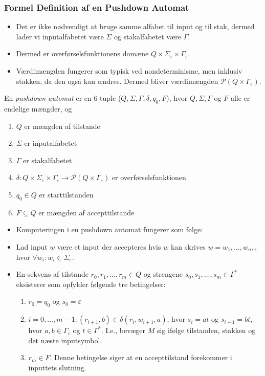\begin{frame}[allowframebreaks]
	\frametitle{Formel Definition af en Pushdown Automat}
	\begin{itemize}
		\item Det er ikke nødvendigt at bruge samme alfabet til input og til stak, dermed lader vi inputalfabetet være $\Sigma$ og stakalfabetet være $\Gamma$.
		\item Dermed er overførselsfunktionens domæne $Q \times \Sigma_{\varepsilon} \times \Gamma_{\varepsilon}$.
		\item Værdimængden fungerer som typisk ved nondeterminisme, men inklusiv stakken, da den også kan ændres. Dermed bliver værdimængden $\mathcal{P}(Q \times \Gamma_{\varepsilon})$.
	\end{itemize}

	\begin{definition}
		En \textit{pushdown automat} er en 6-tuple ($Q, \Sigma, \Gamma, \delta, q_{0}, F$), hvor $Q, \Sigma, \Gamma$ og $F$ alle er endelige mængder, og
		\begin{enumerate}
			\item $Q$ er mængden af tilstande
			\item $\Sigma$ er inputalfabetet
			\item $\Gamma$ er stakalfabetet
			\item $\delta : Q \times \Sigma_{\varepsilon} \times \Gamma_{\varepsilon} \longrightarrow \mathcal{P}(Q \times \Gamma_{\varepsilon})$ er overførselsfunktionen
			\item $q_{0} \in Q$ er starttilstanden
			\item $F \subseteq Q$ er mængden af accepttilstande
		\end{enumerate}
	\end{definition}

	\begin{itemize}
		\item Komputeringen i en pushdown automat fungerer som følge:
		\item Lad input $w$ være et input der accepteres hvis $w$ kan skrives $w = w_{1}, \ldots, w_{n}, $, hvor $\forall w_{i} : w_{i} \in \Sigma_{\varepsilon}$.
		\item En sekvens af tilstande $r_{0}, r_{1}, \ldots, r_{m} \in Q$ og strengene $s_{0}, s_{1}, \ldots, s_{m} \in \Gamma^{*}$ eksisterer som opfylder følgende tre betingelser:
		      \begin{enumerate}
			      \item $r_{0} = q_{0}$ og $s_{0} = \varepsilon$
			      \item $i = 0, \ldots, m-1 : (r_{i+1}, b) \in \delta(r_{i}, w_{i+1}, a)$, hvor $s_{i} = at$ og $s_{i+1} = bt$, hvor $a,b \in \Gamma_{\varepsilon}$ og $t \in \Gamma^{*}$. I.e., bevæger $M$ sig ifølge tilstanden, stakken og det næste inputsymbol.
			      \item $r_{m} \in F$. Denne betingelse siger at en accepttilstand forekommer i inputtets slutning.
		      \end{enumerate}
	\end{itemize}
\end{frame}

